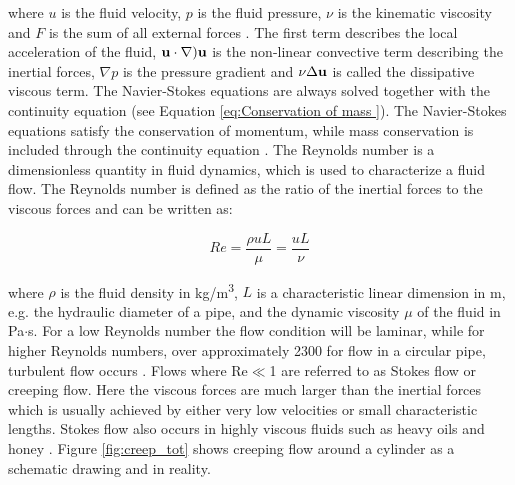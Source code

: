 where $u$ is the fluid velocity, $p$ is the fluid pressure, $\nu$ is the kinematic viscosity and $F$ is the sum of all external forces \cite{versteeg2007introduction}. The first term describes the local acceleration of the fluid, ${\bf u} \cdot \nabla) {\bf u}$ is the non-linear convective term describing the inertial forces, $\nabla p$ is the pressure gradient and $\nu\Delta{\bf u}$ is called the dissipative viscous term. The Navier-Stokes equations are always solved together with the continuity equation (see Equation \ref{eq:Conservation of mass }). The Navier-Stokes equations satisfy the conservation of momentum, while mass conservation is included through the continuity equation \cite{alkahtani2013numerical}. The Reynolds number is a dimensionless quantity in fluid dynamics, which is used to characterize a fluid flow. The Reynolds number is defined as the ratio of the inertial forces to the viscous forces and can be written as:  

\begin{equation}
Re=\frac{\rho u L}{\mu}=\frac{uL}{\nu}
\label{eq:Reynolds}
\end{equation}

where $\rho$ is the fluid density in kg/m\textsuperscript{3}, $L$ is a characteristic linear dimension in m, e.g. the hydraulic diameter of a pipe, and the dynamic viscosity $\mu$ of the fluid in Pa$\cdotp$s. For a low Reynolds number the flow condition will be laminar, while for higher Reynolds numbers, over approximately 2300 for flow in a circular pipe, turbulent flow occurs \cite{schwarze2012cfd}. Flows where Re$\ll$1 are referred to as Stokes flow or creeping flow. Here the viscous forces are much larger than the inertial forces which is usually achieved by either very low velocities or small characteristic lengths. Stokes flow also occurs in highly viscous fluids such as heavy oils and honey \cite{lautrup2004physics}. Figure \ref{fig:creep_tot} shows creeping flow around a cylinder as a schematic drawing and in reality. 

